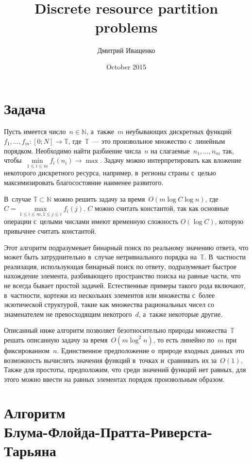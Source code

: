 \documentclass{article}
\title{Discrete resource partition problems}
\author{Дмитрий Иващенко}
\date{October 2015}
\renewcommand{\le}{\leqslant}
\begin{document}
\maketitle

\section{Задача}

Пусть имеется число~$n \in \mathbb{N}$, а~также~$m$ неубывающих дискретных
функций~$f_1, \ldots, f_m\colon [0; N] \rightarrow \mathbb{T}$,
где~$\mathbb{T}$~--- это произвольное множество с~линейным порядком. Необходимо
найти разбиение числа~$n$ на слагаемые~$n_1, \ldots, n_m$ так,
чтобы~$\min\limits_{1\le i\le m} f_i(n_i) \rightarrow \max$. Задачу можно
интерпретировать как вложение некоторого дискретного ресурса, например,
в~регионы страны с~целью максимизировать благосостояние наименее развитого.

В~случае $\mathbb{T} \subset \mathbb{N}$ можно решить задачу за время~$O(m \log
C \log n)$, где~$C = \max\limits_{1 \le i \le m, 1 \le j \le i}f_i(j)$. $C$
можно считать константой, так как основные операции с~целыми числами имеют
временную сложность $O(\log C)$, которую привычнее считать константой.

Этот алгоритм подразумевает бинарный поиск по реальному значению ответа, что
может быть затруднительно в~случае нетривиального порядка на~$\mathbb{T}$.
В~частности реализация, использующая бинарный поиск по ответу, подразумевает
быстрое нахождение элемента, разбивающего пространство поиска на равные части,
что не всегда бывает простой задачей. Естественные примеры такого рода включают,
в~частности, кортежи из нескольких элементов или множества с~более экзотической
структурой, такие как множества рациональных чисел со знаменателем не
превосходящим некотрого~$d$, а~также некоторые другие.

Описанный ниже алгоритм позволяет безотносительно природы множества~$\mathbb{T}$
решать описанную задачу за время~$O(m \log^2 n)$, то есть линейно по~$m$ при
фиксированном~$n$. Единственное предположение о~природе входных данных это
возможность вычислять значения функций в~точках и~сравнивать их за~$O(1)$. Также
для простоты, предположим, что среди значений функций нет равных, для этого
можно ввести на равных элементах порядок произвольным образом.

\section[Алгоритм Блума-Флойда-Пратта-Риверста-Тарьяна]{Алгоритм\\
Блума-Флойда-Пратта-Риверста-Тарьяна}
\end{document}
